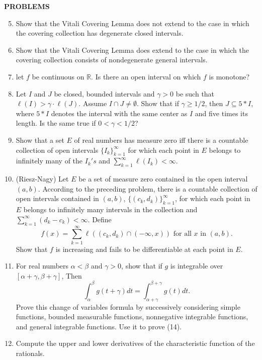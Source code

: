 \begin{center}
	\textbf{PROBLEMS}
\end{center}
\begin{enumerate}
	\setcounter{enumi}{4}
    \item Show that the Vitali Covering Lemma does not extend to the case in which the covering collection has degenerate closed intervals.
    \item Show that the Vitali Covering Lemma does extend to the case in which the covering collection consists of nondegenerate general intervals.
    \item let $f$ be continuous on $\mathbb{R}$. Is there an open interval on which $f$ is monotone?
    \item Let $I$ and $J$ be closed, bounded intervals and $\gamma>0$ be such that $\ell(I)>\gamma\cdot\ell(J)$.
    Assume $I\cap J\neq\emptyset$. Show that if $\gamma\ge 1/2$, then $J\subseteq 5*I$, where $5*I$ denotes the interval with the same center as $I$ and five times its length.
    Is the same true if $0<\gamma<1/2$?
    \item Show that a set $E$ of real numbers has measure zero iff there is a countable collection of open intervals $\{I_k\}_{k=1}^\infty$ for which each point in $E$ belongs to infinitely many of the $I_k's$ and $\sum_{k=1}^\infty\ell(I_k)<\infty$.
    \item (Riesz-Nagy) Let $E$ be a set of measure zero contained in the open interval $(a,b)$.
    According to the preceding problem, there is a countable collection of open intervals contained in $(a,b)$, $\{(c_k,d_k)\}_{k=1}^\infty$, for which each point in $E$ belongs to infinitely many intervals in the collection and $\sum_{k=1}^\infty(d_k-c_k)<\infty$.
    Define
    \[
        f(x)=\sum_{k=1}^\infty\ell((c_k,d_k)\cap(-\infty,x))\text{ for all }x\text{ in }(a,b).
    \]
    Show that $f$ is increasing and fails to be differentiable at each point in $E$.
    \item For real numbers $\alpha<\beta$ and $\gamma>0$, show that if $g$ is integrable over $[\alpha+\gamma,\beta+\gamma]$, Then
    \[
        \int_{\alpha}^{\beta}g(t+\gamma)dt=\int_{\alpha+\gamma}^{\beta+\gamma}g(t)dt.  
    \]
    Prove this change of variables formula by successively considering simple functions, bounded measurable functions, nonnegative integrable functions, and general integrable functions.
    Use it to prove (14).
    \item Compute the upper and lower derivatives of the characteristic function of the rationals.

\end{enumerate}

